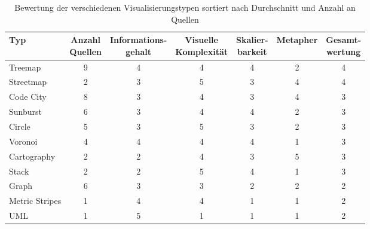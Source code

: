 \begin{table}[htbp]
    \centering
    \scriptsize
    \begin{tabular}{|l|c|c|c|c|c|c|}
        \hline
        \textbf{Typ} & \makecell{\textbf{Anzahl}\\\textbf{Quellen}} & \makecell{\textbf{Informations-}\\\textbf{gehalt}} & \makecell{\textbf{Visuelle}\\\textbf{Komplexität}} & \makecell{\textbf{Skalier-}\\\textbf{barkeit}} & \textbf{Metapher} & \makecell{\textbf{Gesamt-}\\\textbf{wertung}} \\
        \hline
        Treemap & 9 & 4 & 4 & 4 & 2 & 4 \\
        Streetmap & 2 & 3 & 5 & 3 & 4 & 4 \\
        Code City & 8 & 3 & 4 & 3 & 4 & 3 \\
        Sunburst & 6 & 3 & 4 & 4 & 2 & 3 \\
        Circle & 5 & 3 & 5 & 3 & 2 & 3 \\
        Voronoi & 4 & 4 & 4 & 4 & 1 & 3 \\
        Cartography & 2 & 2 & 4 & 3 & 5 & 3 \\
        Stack & 2 & 2 & 5 & 4 & 1 & 3 \\
        Graph & 6 & 3 & 3 & 2 & 2 & 2 \\
        Metric Stripes & 1 & 4 & 4 & 1 & 1 & 2 \\
        UML & 1 & 5 & 1 & 1 & 1 & 2 \\
 \hline
 \end{tabular}
 \caption[Bewertung der verschiedenen Visualisierungstypen]{Bewertung der verschiedenen Visualisierungstypen sortiert nach Durchschnitt und Anzahl an Quellen}
 \label{tab:visEval_grouped}
\end{table}
